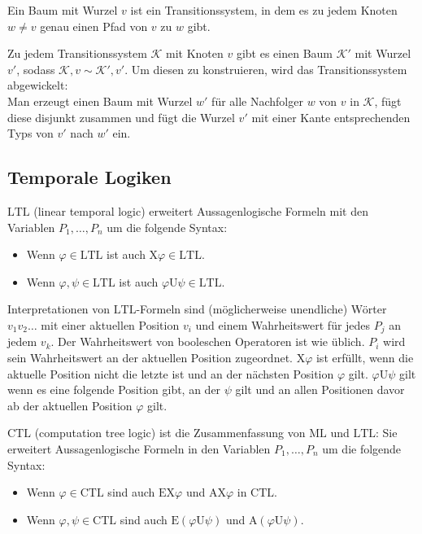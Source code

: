 \documentclass{panikzettel}
\newcommand{\K}{\mathcal{K}}
\newcommand{\ML}{\mathrm{ML}}
\newcommand{\LTL}{\mathrm{LTL}}
\newcommand{\CTL}{\mathrm{CTL}}
\newcommand{\X}{\mathrm{X}}
\newcommand{\until}{\mathrm{U}}
\begin{document}
Ein Baum mit Wurzel $v$ ist ein Transitionssystem, in dem es zu jedem Knoten $w \ne v$ genau einen Pfad von $v$ zu $w$ gibt.

Zu jedem Transitionssystem $\K$ mit Knoten $v$ gibt es einen Baum $\K'$ mit Wurzel $v'$, sodass $\K, v \sim \K', v'$. Um diesen zu konstruieren, wird das Transitionssystem \glqq abgewickelt\grqq:    \\
Man erzeugt einen Baum mit Wurzel $w'$ für alle Nachfolger $w$ von $v$ in $\K$, fügt diese disjunkt zusammen und fügt die Wurzel $v'$ mit einer Kante entsprechenden Typs von $v'$ nach $w'$ ein.

\subsection{Temporale Logiken}

$\LTL$ (\glqq linear temporal logic\grqq) erweitert Aussagenlogische Formeln mit den Variablen $P_1,\ldots,P_n$ um die folgende Syntax:
\begin{itemize}
\item Wenn $\varphi \in \LTL$ ist auch $\X\varphi \in \LTL$.
\item Wenn $\varphi, \psi \in \LTL$ ist auch $\varphi \until \psi \in \LTL$.
\end{itemize}

Interpretationen von $\LTL$-Formeln sind (möglicherweise unendliche) Wörter $v_1v_2\ldots$ mit einer aktuellen Position $v_i$ und einem Wahrheitswert für jedes $P_j$ an jedem $v_k$. Der Wahrheitswert von booleschen Operatoren ist wie üblich. $P_i$ wird sein Wahrheitswert an der aktuellen Position zugeordnet. $\X\varphi$ ist erfüllt, wenn die aktuelle Position nicht die letzte ist und an der nächsten Position $\varphi$ gilt. $\varphi\until\psi$ gilt wenn es eine folgende Position gibt, an der $\psi$ gilt und an allen Positionen davor ab der aktuellen Position $\varphi$ gilt.

$\CTL$ (\glqq computation tree logic\grqq) ist die Zusammenfassung von $\ML$ und $\LTL$: Sie erweitert Aussagenlogische Formeln in den Variablen $P_1,\ldots,P_n$ um die folgende Syntax:
\begin{itemize}
\item Wenn $\varphi \in \CTL$ sind auch $\mathrm{E}\X\varphi$ und $\mathrm{A}\X\varphi$ in $\CTL$.
\item Wenn $\varphi, \psi \in \CTL$ sind auch $\mathrm{E}(\varphi \until \psi)$ und $\mathrm{A}(\varphi\until\psi)$.
\end{itemize}
\end{document}
